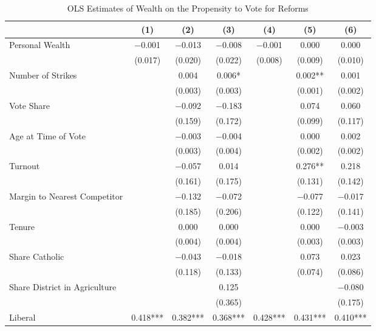 \begin{table}

\caption{\label{tab:suffrage_govtint_together}OLS Estimates of Wealth on the Propensity to Vote for Reforms}
\centering
\begin{tabular}[t]{lcccccc}
\toprule
  & (1) & (2) & (3) & (4) & (5) & (6)\\
\midrule
Personal Wealth & \num{-0.001} & \num{-0.013} & \num{-0.008} & \num{-0.001} & \num{0.000} & \num{0.000}\\
 & (\num{0.017}) & (\num{0.020}) & (\num{0.022}) & (\num{0.008}) & (\num{0.009}) & (\num{0.010})\\
Number of Strikes &  & \num{0.004} & \num{0.006}* &  & \num{0.002}** & \num{0.001}\\
 &  & (\num{0.003}) & (\num{0.003}) &  & (\num{0.001}) & (\num{0.002})\\
Vote Share &  & \num{-0.092} & \num{-0.183} &  & \num{0.074} & \num{0.060}\\
 &  & (\num{0.159}) & (\num{0.172}) &  & (\num{0.099}) & (\num{0.117})\\
Age at Time of Vote &  & \num{-0.003} & \num{-0.004} &  & \num{0.000} & \num{0.002}\\
 &  & (\num{0.003}) & (\num{0.004}) &  & (\num{0.002}) & (\num{0.002})\\
Turnout &  & \num{-0.057} & \num{0.014} &  & \num{0.276}** & \num{0.218}\\
 &  & (\num{0.161}) & (\num{0.175}) &  & (\num{0.131}) & (\num{0.142})\\
Margin to Nearest Competitor &  & \num{-0.132} & \num{-0.072} &  & \num{-0.077} & \num{-0.017}\\
 &  & (\num{0.185}) & (\num{0.206}) &  & (\num{0.122}) & (\num{0.141})\\
Tenure &  & \num{0.000} & \num{0.000} &  & \num{0.000} & \num{-0.003}\\
 &  & (\num{0.004}) & (\num{0.004}) &  & (\num{0.003}) & (\num{0.003})\\
Share Catholic &  & \num{-0.043} & \num{-0.018} &  & \num{0.073} & \num{0.023}\\
 &  & (\num{0.118}) & (\num{0.133}) &  & (\num{0.074}) & (\num{0.086})\\
Share District in Agriculture &  &  & \num{0.125} &  &  & \num{-0.080}\\
 &  &  & (\num{0.365}) &  &  & (\num{0.175})\\
Liberal & \num{0.418}*** & \num{0.382}*** & \num{0.368}*** & \num{0.428}*** & \num{0.431}*** & \num{0.410}***\\

\end{tabular}
\end{table}
